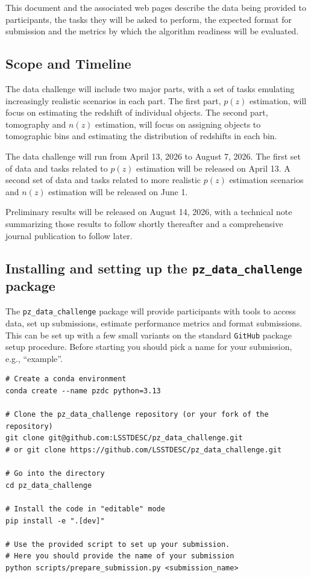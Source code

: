 \documentclass[11pt,twoside,letterpaper,onecolumn,english]{article}
\begin{document}
This document and the associated web pages describe the data being
provided to participants, the tasks they will be asked to perform, the
expected format for submission and the metrics by which the algorithm
readiness will be evaluated.


\subsection{Scope and Timeline}

The data challenge will include two major parts, with a set of
tasks emulating increasingly realistic scenarios in each part. The
first part, $p(z)$ estimation, will focus on estimating the redshift of
individual objects. The second part, tomography and $n(z)$ estimation,
will focus on assigning objects to tomographic bins and estimating the
distribution of redshifts in each bin.

The data challenge will run from April 13, 2026 to August 7, 2026.
The first set of data and tasks related to $p(z)$ estimation will be
released on April 13. A second set of data and tasks related to more
realistic $p(z)$ estimation scenarios and $n(z)$ estimation will be
released on June 1.

Preliminary results will be released on August 14, 2026, with a
technical note summarizing those results to follow shortly thereafter and
a comprehensive journal publication to follow later.


\subsection{Installing and setting up the \texttt{pz\_data\_challenge}
  package}

The \texttt{pz\_data\_challenge} package will provide participants with tools
to access data, set up submissions, estimate performance metrics and
format submissions.  This can be set up with a few small
variants on the standard \texttt{GitHub} package setup procedure.
Before starting you should pick a name for your submission, e.g., ``example''.

\begin{verbatim}
# Create a conda environment
conda create --name pzdc python=3.13

# Clone the pz_data_challenge repository (or your fork of the repository)
git clone git@github.com:LSSTDESC/pz_data_challenge.git
# or git clone https://github.com/LSSTDESC/pz_data_challenge.git

# Go into the directory
cd pz_data_challenge

# Install the code in "editable" mode
pip install -e ".[dev]"

# Use the provided script to set up your submission.
# Here you should provide the name of your submission
python scripts/prepare_submission.py <submission_name>
\end{verbatim}
\end{document}
